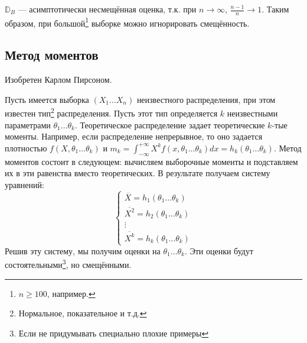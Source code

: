 \begin{remark}
    \(\mathbb{D}_B\) --- асимптотически несмещённая оценка, т.к. при \(n \to \infty\), \(\frac{n - 1}{n} \to 1\). Таким образом, при большой\footnote{\(n \geq 100\), например.} выборке можно игнорировать смещённость.
\end{remark}

\subsection{Метод моментов}

Изобретен Карлом Пирсоном.

Пусть имеется выборка \((X_1 \dots X_n)\) неизвестного распределения, при этом известен тип\footnote{Нормальное, показательное и т.д.} распределения. Пусть этот тип определяется \(k\) неизвестными параметрами \(\theta_1 \dots \theta_k\). Теоретическое распределение задает теоретические \(k\)-тые моменты. Например, если распределение непрерывное, то оно задается плотностью \(f(X, \theta_1 \dots \theta_k)\) и \(m_k = \int_{ - \infty}^{ +\infty} X^k f(x, \theta_1 \dots \theta_k) dx = h_k(\theta_1 \dots \theta_k)\). Метод моментов состоит в следующем: вычисляем выборочные моменты и подставляем их в эти равенства вместо теоретических. В результате получаем систему уравнений:
\[\begin{cases}
        \overline{X} = h_1(\theta_1 \dots \theta_k)   \\
        \overline{X^2} = h_2(\theta_1 \dots \theta_k) \\
        \vdots                                        \\
        \overline{X^k} = h_k(\theta_1 \dots \theta_k)
    \end{cases}\]
Решив эту систему, мы получим оценки на \(\theta_1 \dots \theta_k\). Эти оценки будут состоятельными\footnote{Если не придумывать специально плохие примеры}, но смещёнными.

